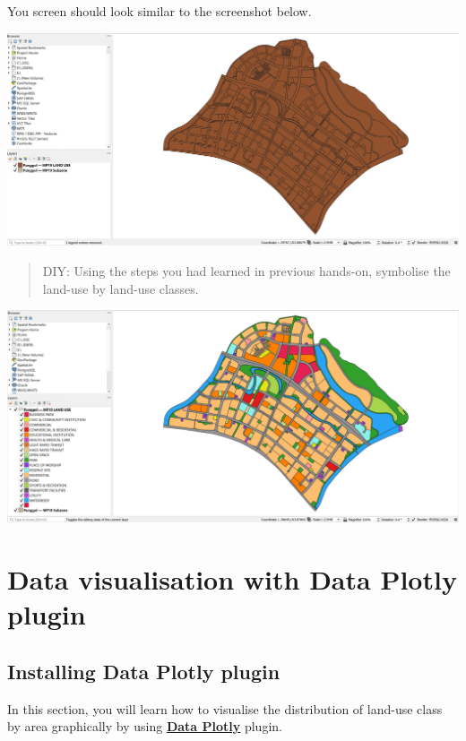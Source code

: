\documentclass[
  letterpaper,
  DIV=11,
  numbers=noendperiod]{scrreprt}
\begin{document}
You screen should look similar to the screenshot below.

\includegraphics{./img04/image31.jpg}

\begin{quote}
DIY: Using the steps you had learned in previous hands-on, symbolise the
land-use by land-use classes.
\end{quote}

\includegraphics{./img04/image32.jpg}

\hypertarget{data-visualisation-with-data-plotly-plugin}{%
\section{Data visualisation with Data Plotly
plugin}\label{data-visualisation-with-data-plotly-plugin}}

\hypertarget{installing-data-plotly-plugin}{%
\subsection{Installing Data Plotly
plugin}\label{installing-data-plotly-plugin}}

In this section, you will learn how to visualise the distribution of
land-use class by area graphically by using
\href{https://github.com/ghtmtt/DataPlotly}{\textbf{Data Plotly}}
plugin.
\end{document}
